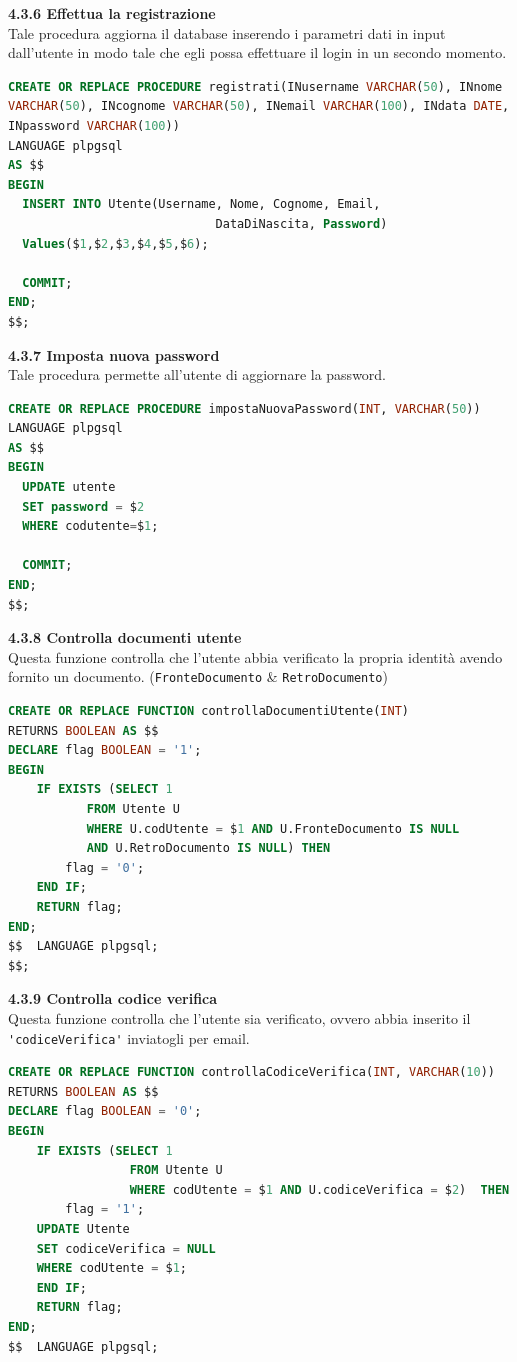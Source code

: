\documentclass[a4paper,12pt]{article}
\begin{document}
\vspace*{+1cm}

{\flushleft \bf 4.3.6  Effettua la registrazione}\\
Tale procedura aggiorna il database inserendo i parametri dati in input dall'utente in
modo tale che egli possa effettuare il login in un secondo momento.
\begin{lstlisting}[language=SQL]
CREATE OR REPLACE PROCEDURE registrati(INusername VARCHAR(50), INnome 
VARCHAR(50), INcognome VARCHAR(50), INemail VARCHAR(100), INdata DATE, 
INpassword VARCHAR(100))
LANGUAGE plpgsql
AS $$
BEGIN
  INSERT INTO Utente(Username, Nome, Cognome, Email, 
  					         DataDiNascita, Password)
  Values($1,$2,$3,$4,$5,$6);

  COMMIT;
END;
$$;
\end{lstlisting}
\newpage

\newpage\null{}\setcounter{page}{19}
\vspace{-2cm}
{\flushleft \bf 4.3.7  Imposta nuova password}\\
Tale procedura permette all'utente di aggiornare la password.
\begin{lstlisting}[language=SQL]
CREATE OR REPLACE PROCEDURE impostaNuovaPassword(INT, VARCHAR(50))
LANGUAGE plpgsql
AS $$
BEGIN
  UPDATE utente
  SET password = $2
  WHERE codutente=$1;

  COMMIT;
END;
$$;
\end{lstlisting}

\vspace*{+1cm}

{\flushleft \bf 4.3.8  Controlla documenti utente}\\
Questa funzione controlla che l'utente abbia verificato la propria identità avendo
fornito un documento. (\verb|FronteDocumento| \& \verb|RetroDocumento|)
\begin{lstlisting}[language=SQL]
CREATE OR REPLACE FUNCTION controllaDocumentiUtente(INT)
RETURNS BOOLEAN AS $$
DECLARE flag BOOLEAN = '1';
BEGIN
	IF EXISTS (SELECT 1
		   FROM Utente U
		   WHERE U.codUtente = $1 AND U.FronteDocumento IS NULL 
		   AND U.RetroDocumento IS NULL) THEN
		flag = '0';
	END IF;
	RETURN flag;
END;
$$  LANGUAGE plpgsql;
$$;
\end{lstlisting}

\vspace*{+1cm}

{\flushleft \bf 4.3.9  Controlla codice verifica}\\
Questa funzione controlla che l'utente sia verificato, ovvero abbia inserito
il \verb|'codiceVerifica'| inviatogli per email.
\begin{lstlisting}[language=SQL]
CREATE OR REPLACE FUNCTION controllaCodiceVerifica(INT, VARCHAR(10))
RETURNS BOOLEAN AS $$
DECLARE flag BOOLEAN = '0';
BEGIN
	IF EXISTS (SELECT 1
		   	     FROM Utente U
		      	 WHERE codUtente = $1 AND U.codiceVerifica = $2)  THEN
		flag = '1';
    UPDATE Utente 
    SET codiceVerifica = NULL 
    WHERE codUtente = $1;
	END IF;
	RETURN flag;
END;
$$  LANGUAGE plpgsql;
\end{lstlisting}
\newpage
\end{document}
